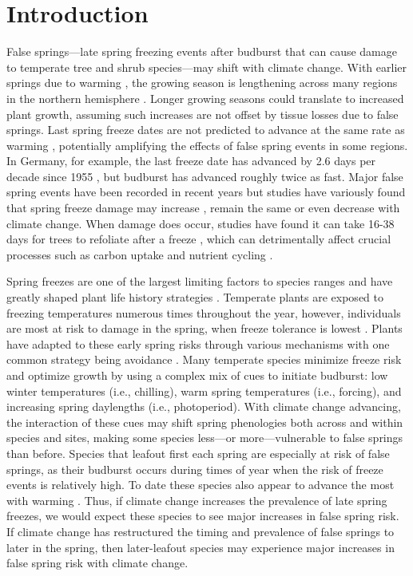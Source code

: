 \documentclass{article}\usepackage[]{graphicx}\usepackage[]{color}
\begin{document}
\section*{Introduction}
False springs---late spring freezing events after budburst that can cause damage to temperate tree and shrub species---may shift with climate change. With earlier springs due to warming \citep{IPCC2014, Wolkovich2012}, the growing season is lengthening across many regions in the northern hemisphere \citep{Chen2005, Kukal2018, Liu2006}. Longer growing seasons could translate to increased plant growth, assuming such increases are not offset by tissue losses due to false springs. Last spring freeze dates are not predicted to advance at the same rate as warming \citep{Inouye2008, Labe2016, Martin2010,Wypych2016a,Sgubin2018}, potentially amplifying the effects of false spring events in some regions. In Germany, for example, the last freeze date has advanced by 2.6 days per decade since 1955 \citep{Zohner2016}, but budburst has advanced roughly twice as fast. Major false spring events have been recorded in recent years but studies have variously found that spring freeze damage may increase \citep{Augspurger2013, Hannenin1991, Labe2016}, remain the same \citep{Scheifinger2003} or even decrease \citep{Kramer1994, Vitra2017} with climate change. When damage does occur, studies have found it can take 16-38 days for trees to refoliate after a freeze \citep{Augspurger2009, Augspurger2013, Gu2008, Menzel2015}, which can detrimentally affect crucial processes such as carbon uptake and nutrient cycling \citep{Hufkens2012, Klosterman2018, Richardson2013}.  

Spring freezes are one of the largest limiting factors to species ranges and have greatly shaped plant life history strategies \citep{Kollas2014}. Temperate plants are exposed to freezing temperatures numerous times throughout the year, however, individuals are most at risk to damage in the spring, when freeze tolerance is lowest \citep{Sakai1987}. Plants have adapted to these early spring risks through various mechanisms with one common strategy being avoidance \citep{Vitasse2014}. Many temperate species minimize freeze risk and optimize growth by using a complex mix of cues to initiate budburst: low winter temperatures (i.e., chilling), warm spring temperatures (i.e., forcing), and increasing spring daylengths (i.e., photoperiod). With climate change advancing, the interaction of these cues may shift spring phenologies both across and within species and sites, making some species less---or more---vulnerable to false springs than before. Species that leafout first each spring are especially at risk of false springs, as their budburst occurs during times of year when the risk of freeze events is relatively high. To date these species also appear to advance the most with warming  \citep{Wolkovich2012}. Thus, if climate change increases the prevalence of late spring freezes, we would expect these species to see major increases in false spring risk. If climate change has restructured the timing and prevalence of false springs to later in the spring, then later-leafout species may experience major increases in false spring risk with climate change. 
\end{document}
